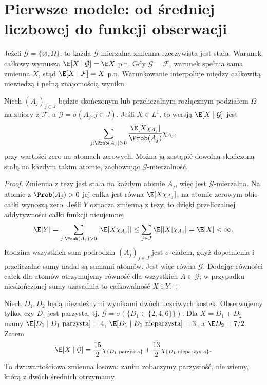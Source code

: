 \section{Pierwsze modele: od średniej liczbowej do funkcji obserwacji}

\begin{przyklad}
Jeżeli $\mathcal G=\{\varnothing,\Omega\}$, to
każda $\mathcal G$-mierzalna zmienna rzeczywista jest
stała. Warunek całkowy wymusza
$\E[X\mid\mathcal G]=\E X$ p.n. Gdy
$\mathcal G=\mathcal F$, warunek spełnia sama
zmienna $X$, stąd $\E[X\mid\mathcal F]=X$ p.n.
Warunkowanie interpoluje między całkowitą niewiedzą
i pełną znajomością wyniku.
\end{przyklad}

\begin{twierdzenie}
Niech $(A_j)_{j\in J}$ będzie skończonym lub przeliczalnym
rozłącznym podziałem $\Omega$ na zbiory z $\mathcal F$,
a $\mathcal G=\sigma(A_j:j\in J)$.
Jeśli $X\in L^1$, to wersją $\E[X\mid\mathcal G]$ jest
\[
\sum_{j:\Prob(A_j)>0}
\frac{\E[X\chi_{A_j}]}{\Prob(A_j)}\chi_{A_j},
\]
przy wartości zero na atomach zerowych. Można ją
zastąpić dowolną skończoną stałą na każdym takim atomie,
zachowując $\mathcal G$-mierzalność.
\end{twierdzenie}
\begin{proof}
Zmienna z tezy jest stała na każdym atomie $A_j$,
więc jest $\mathcal G$-mierzalna. Na atomie
z $\Prob(A_j)>0$ jej całka jest równa
$\E[X\chi_{A_j}]$; na atomie zerowym obie całki
wynoszą zero. Jeśli $Y$ oznacza zmienną z tezy, to dzięki
przeliczalnej addytywności całki funkcji nieujemnej
\[
\E|Y|=\sum_{j:\Prob(A_j)>0}|\E[X\chi_{A_j}]|
\leq\sum_{j\in J}\E[|X|\chi_{A_j}]=\E|X|<\infty.
\]
Rodzina wszystkich sum podrodzin $(A_j)_{j\in J}$
jest $\sigma$-ciałem, gdyż dopełnienia i przeliczalne
sumy nadal są sumami atomów. Jest więc równa
$\mathcal G$. Dodając równości całek dla atomów
otrzymujemy równość dla wszystkich $A\in\mathcal G$;
w przypadku nieskończonej sumy uzasadnia to
całkowalność $X$ i $Y$.
\end{proof}

\begin{przyklad}
Niech $D_1,D_2$ będą niezależnymi wynikami dwóch
uczciwych kostek. Obserwujemy tylko, czy $D_1$ jest
parzysta, tj. $\mathcal G=\sigma(\{D_1\in\{2,4,6\}\})$.
Dla $X=D_1+D_2$ mamy
$\E[D_1\mid D_1\text{ parzysta}]=4$,
$\E[D_1\mid D_1\text{ nieparzysta}]=3$,
a $\E D_2=7/2$. Zatem
\[
\E[X\mid\mathcal G]
=\frac{15}{2}\chi_{\{D_1\text{ parzysta}\}}
+\frac{13}{2}\chi_{\{D_1\text{ nieparzysta}\}}.
\]
To dwuwartościowa zmienna losowa: zanim zobaczymy
parzystość, nie wiemy, którą z dwóch średnich otrzymamy.
\end{przyklad}

